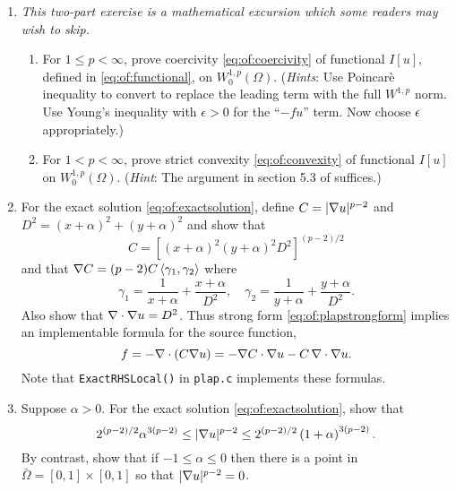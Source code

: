 \renewcommand{\labelenumi}{\arabic{chapter}.\arabic{enumi}\quad}
\renewcommand{\labelenumii}{(\alph{enumii})}
\begin{enumerate}
\item  \label{exer:of:twoproperties}  \emph{This two-part exercise is a mathematical excursion which some readers may wish to skip.}
  \begin{enumerate}
  \item For $1 \le p < \infty$, prove coercivity \eqref{eq:of:coercivity} of functional $I[u]$, defined in \eqref{eq:of:functional}, on $W_0^{1,p}(\Omega)$.  (\emph{Hints}:  Use Poincar\`e inequality \citep[Theorem 6.30]{AdamsFournier2003} to convert to replace the leading term with the full $W^{1,p}$ norm.  Use Young's inequality with $\epsilon>0$ \citep[Appendix B]{Evans2010} for the ``$-fu$'' term.  Now choose $\epsilon$ appropriately.)
  \item For $1 < p < \infty$, prove strict convexity \eqref{eq:of:convexity} of functional $I[u]$ on $W_0^{1,p}(\Omega)$.  (\emph{Hint}:  The argument in section 5.3 of \citet{Ciarlet2002} suffices.)
  \end{enumerate}
 
\item \label{exer:of:checkexactformulas}  For the exact solution \eqref{eq:of:exactsolution}, define $C = |\nabla u|^{p-2}$ and $D^2=(x+\alpha)^2 + (y+\alpha)^2$ and show that
    $$C = \left[(x+\alpha)^2 (y+\alpha)^2 D^2\right]^{(p-2)/2}$$
and that $\nabla C = (p-2) C \left<\gamma_1,\gamma_2\right>$ where
    $$\gamma_1 = \frac{1}{x+\alpha}+ \frac{x+\alpha}{D^2}, \quad \gamma_2 = \frac{1}{y+\alpha}+ \frac{y+\alpha}{D^2}.$$
Also show that $\nabla\cdot \nabla u = D^2$.  Thus strong form \eqref{eq:of:plapstrongform} implies an implementable formula for the source function,
    $$f = - \nabla\cdot \left(C \nabla u\right) = - \nabla C \cdot \nabla u - C\, \nabla\cdot \nabla u.$$
Note that \texttt{ExactRHSLocal()} in \texttt{plap.c} implements these formulas.

\item \label{exer:of:checkexactbounds} Suppose $\alpha > 0$.  For the exact solution \eqref{eq:of:exactsolution}, show that
\begin{equation}
2^{(p-2)/2} \alpha^{3(p-2)} \le |\nabla u|^{p-2} \le 2^{(p-2)/2} \left(1+\alpha\right)^{3(p-2)}.  \label{eq:of:coeffbounds}
\end{equation}
By contrast, show that if $-1 \le \alpha \le 0$ then there is a point in $\bar\Omega=[0,1]\times[0,1]$ so that $|\nabla u|^{p-2}=0$.


\end{enumerate}
